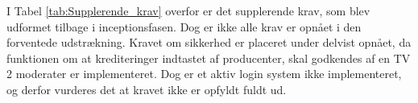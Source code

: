 I Tabel \ref{tab:Supplerende_krav} overfor er det supplerende krav, som blev udformet tilbage i inceptionsfasen. Dog er ikke alle krav er opnået i den forventede udstrækning. Kravet om sikkerhed er placeret under delvist opnået, da funktionen om at krediteringer indtastet af producenter, skal godkendes af en TV 2 moderater er implementeret. Dog er et aktiv login system ikke implementeret, og derfor vurderes det at kravet ikke er opfyldt fuldt ud.

